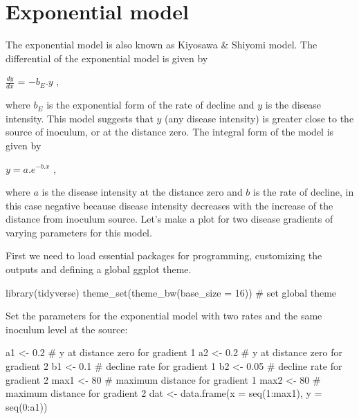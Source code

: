 \documentclass[
  letterpaper,
  DIV=11,
  numbers=noendperiod]{scrreprt}
\newenvironment{Shaded}{\begin{snugshade}}{\end{snugshade}}
\newcommand{\AttributeTok}[1]{\textcolor[rgb]{0.40,0.45,0.13}{#1}}
\newcommand{\CommentTok}[1]{\textcolor[rgb]{0.37,0.37,0.37}{#1}}
\newcommand{\DecValTok}[1]{\textcolor[rgb]{0.68,0.00,0.00}{#1}}
\newcommand{\FloatTok}[1]{\textcolor[rgb]{0.68,0.00,0.00}{#1}}
\newcommand{\FunctionTok}[1]{\textcolor[rgb]{0.28,0.35,0.67}{#1}}
\newcommand{\NormalTok}[1]{\textcolor[rgb]{0.00,0.23,0.31}{#1}}
\newcommand{\OtherTok}[1]{\textcolor[rgb]{0.00,0.23,0.31}{#1}}
\newcommand{\SpecialCharTok}[1]{\textcolor[rgb]{0.37,0.37,0.37}{#1}}
\begin{document}
\hypertarget{exponential-model}{%
\section{Exponential model}\label{exponential-model}}

The exponential model is also known as Kiyosawa \& Shiyomi model. The
differential of the exponential model is given by

\(\frac{dy}{dx}\) = \(-b_{E}.y\) ,

where \(b_{E}\) is the exponential form of the rate of decline and \(y\)
is the disease intensity. This model suggests that \(y\) (any disease
intensity) is greater close to the source of inoculum, or at the
distance zero. The integral form of the model is given by

\(y = a . e^{-b.x}\) ,

where \(a\) is the disease intensity at the distance zero and \(b\) is
the rate of decline, in this case negative because disease intensity
decreases with the increase of the distance from inoculum source. Let's
make a plot for two disease gradients of varying parameters for this
model.

First we need to load essential packages for programming, customizing
the outputs and defining a global ggplot theme.

\begin{Shaded}
\begin{Highlighting}[]
\FunctionTok{library}\NormalTok{(tidyverse)}
\FunctionTok{theme\_set}\NormalTok{(}\FunctionTok{theme\_bw}\NormalTok{(}\AttributeTok{base\_size =} \DecValTok{16}\NormalTok{)) }\CommentTok{\# set global theme}
\end{Highlighting}
\end{Shaded}

Set the parameters for the exponential model with two rates and the same
inoculum level at the source:

\begin{Shaded}
\begin{Highlighting}[]
\NormalTok{a1 }\OtherTok{\textless{}{-}} \FloatTok{0.2} \CommentTok{\# y at distance zero for gradient 1}
\NormalTok{a2 }\OtherTok{\textless{}{-}} \FloatTok{0.2} \CommentTok{\# y at distance zero for gradient 2}
\NormalTok{b1 }\OtherTok{\textless{}{-}} \FloatTok{0.1} \CommentTok{\# decline rate for gradient 1}
\NormalTok{b2 }\OtherTok{\textless{}{-}} \FloatTok{0.05} \CommentTok{\# decline rate for gradient 2}
\NormalTok{max1 }\OtherTok{\textless{}{-}} \DecValTok{80} \CommentTok{\# maximum distance for gradient 1}
\NormalTok{max2 }\OtherTok{\textless{}{-}} \DecValTok{80} \CommentTok{\# maximum distance for gradient 2}
\NormalTok{dat }\OtherTok{\textless{}{-}} \FunctionTok{data.frame}\NormalTok{(}\AttributeTok{x =} \FunctionTok{seq}\NormalTok{(}\DecValTok{1}\SpecialCharTok{:}\NormalTok{max1), }\AttributeTok{y =} \FunctionTok{seq}\NormalTok{(}\DecValTok{0}\SpecialCharTok{:}\NormalTok{a1))}
\end{Highlighting}
\end{Shaded}
\end{document}
